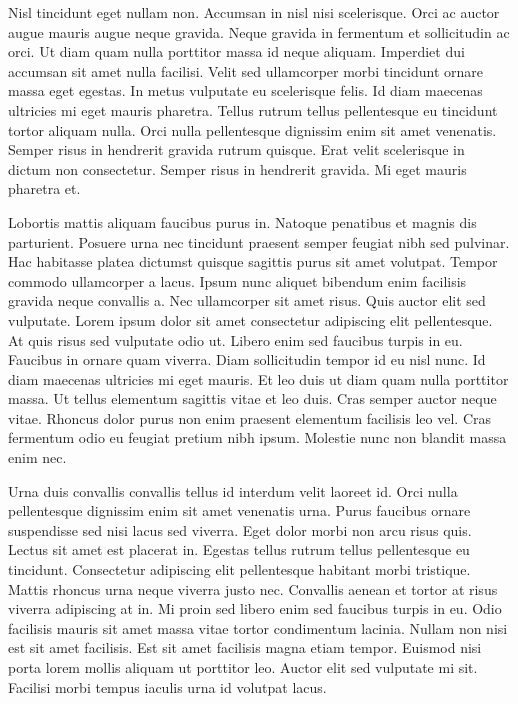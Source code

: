 \documentclass[a4paper]{article}
\begin{document}
Nisl tincidunt eget nullam non. Accumsan in nisl nisi scelerisque. Orci ac auctor augue mauris augue neque gravida. Neque gravida in fermentum et sollicitudin ac orci. Ut diam quam nulla porttitor massa id neque aliquam. Imperdiet dui accumsan sit amet nulla facilisi. Velit sed ullamcorper morbi tincidunt ornare massa eget egestas. In metus vulputate eu scelerisque felis. Id diam maecenas ultricies mi eget mauris pharetra. Tellus rutrum tellus pellentesque eu tincidunt tortor aliquam nulla. Orci nulla pellentesque dignissim enim sit amet venenatis. Semper risus in hendrerit gravida rutrum quisque. Erat velit scelerisque in dictum non consectetur. Semper risus in hendrerit gravida. Mi eget mauris pharetra et.

Lobortis mattis aliquam faucibus purus in. Natoque penatibus et magnis dis parturient. Posuere urna nec tincidunt praesent semper feugiat nibh sed pulvinar. Hac habitasse platea dictumst quisque sagittis purus sit amet volutpat. Tempor commodo ullamcorper a lacus. Ipsum nunc aliquet bibendum enim facilisis gravida neque convallis a. Nec ullamcorper sit amet risus. Quis auctor elit sed vulputate. Lorem ipsum dolor sit amet consectetur adipiscing elit pellentesque. At quis risus sed vulputate odio ut. Libero enim sed faucibus turpis in eu. Faucibus in ornare quam viverra. Diam sollicitudin tempor id eu nisl nunc. Id diam maecenas ultricies mi eget mauris. Et leo duis ut diam quam nulla porttitor massa. Ut tellus elementum sagittis vitae et leo duis. Cras semper auctor neque vitae. Rhoncus dolor purus non enim praesent elementum facilisis leo vel. Cras fermentum odio eu feugiat pretium nibh ipsum. Molestie nunc non blandit massa enim nec.

Urna duis convallis convallis tellus id interdum velit laoreet id. Orci nulla pellentesque dignissim enim sit amet venenatis urna. Purus faucibus ornare suspendisse sed nisi lacus sed viverra. Eget dolor morbi non arcu risus quis. Lectus sit amet est placerat in. Egestas tellus rutrum tellus pellentesque eu tincidunt. Consectetur adipiscing elit pellentesque habitant morbi tristique. Mattis rhoncus urna neque viverra justo nec. Convallis aenean et tortor at risus viverra adipiscing at in. Mi proin sed libero enim sed faucibus turpis in eu. Odio facilisis mauris sit amet massa vitae tortor condimentum lacinia. Nullam non nisi est sit amet facilisis. Est sit amet facilisis magna etiam tempor. Euismod nisi porta lorem mollis aliquam ut porttitor leo. Auctor elit sed vulputate mi sit. Facilisi morbi tempus iaculis urna id volutpat lacus.
\end{document}
